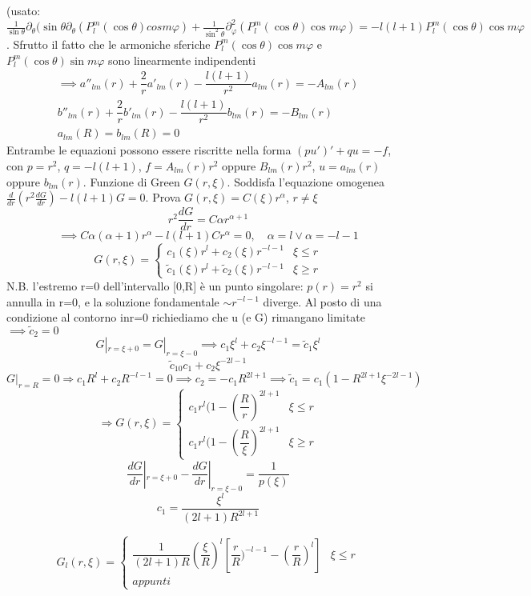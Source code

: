 \documentclass[a4paper,11pt]{report}
\begin{document}
(usato: $\frac{1}{\sin\theta}\partial_\theta(\sin \theta\partial_\theta(P_l^m(\cos\theta)cos m \varphi)+\frac{1}{\sin^2\theta} \partial^2_\varphi(P_l^m(\cos\theta)\cos m\varphi)=-l(l+1)P_l^m(\cos\theta)\cos m\varphi$. Sfrutto il fatto che le armoniche sferiche $P_l^m(\cos\theta)\cos m\varphi$ e $P_l^m(\cos\theta)\sin m\varphi$ sono linearmente indipendenti
\begin{equation}
\begin{matrix}
\implies a''_{lm}(r) +\dfrac{2}{r}a'_{lm}(r) - \dfrac{l(l+1)}{r^2}a_{lm}(r)=-A_{lm}(r)\\
 b''_{lm}(r) +\dfrac{2}{r}b'_{lm}(r) - \dfrac{l(l+1)}{r^2}b_{lm}(r)=-B_{lm}(r)\\
a_{lm}(R)=b_{lm}(R)=0
\end{matrix}
\end{equation}
Entrambe le equazioni possono essere riscritte nella forma $(pu')' + qu=-f$, con $p=r^2$, $q=-l(l+1)$, $f=A_{lm}(r)r^2$ oppure $B_{lm}(r)r^2$, $u=a_{lm}(r)$ oppure $b_{lm}(r)$. 
Funzione di Green $G(r,\xi)$. Soddisfa l'equazione omogenea $\frac{d}{dr}\left(r^2\frac{dG}{dr}\right)-l(l+1)G=0$. Prova $G(r,\xi)=C(\xi)r^\alpha$, $r\neq \xi$
$$
r^2\dfrac{dG}{dr}=C\alpha r^{\alpha+1}
$$
$$
\implies C\alpha(\alpha+1)r^\alpha - l(l+1)Cr^\alpha=0, \quad \alpha=l \vee \alpha=-l-1
$$
$$
G(r,\xi)=\left\{
\begin{matrix}
c_1(\xi)r^l + c_2(\xi)r^{-l-1} & \xi\leq r\\
\tilde{c}_1(\xi)r^l + \tilde{c}_2(\xi)r^{-l-1} & \xi \geq r
\end{matrix}\right.
$$
N.B. l'estremo r=0 dell'intervallo [0,R] è un punto singolare: $p(r)=r^2$ si annulla in r=0, e la soluzione fondamentale $\sim r^{-l-1}$ diverge.
Al posto di una condizione al contorno inr=0 richiediamo che u (e G) rimangano limitate $\implies \tilde{c}_2=0$
$$
G|_{r=\xi+0}=G|_{r=\xi-0} \implies c_1\xi^l + c_2\xi^{-l-1}=\tilde{c}_1\xi^l
$$
$$
\tilde{c}_10c_1 + c_2 \xi^{-2l-1}
$$
$$
G|_{r=R}=0 \Rightarrow c_1R^l+c_2R^{-l-1}=0 \implies c_2=-c_1R^{2l + 1} \implies \tilde{c}_1=c_1(1-R^{2l+1}\xi^{-2l-1})
$$
$$
\Rightarrow G(r,\xi)=\left\{\begin{matrix}
c_1r^l(1-(\dfrac{R}{r})^{2l+1} & \xi\leq r \\
c_1r^l(1-(\dfrac{R}{\xi})^{2l+1} & \xi\geq r 
\end{matrix}\right.
$$
$$
\dfrac{dG}{dr}|_{r=\xi+0}-\dfrac{dG}{dr}|_{r=\xi-0}=\dfrac{1}{p(\xi)}
$$
$$
c_1=\dfrac{\xi^l}{(2l+1)R^{2l+1}}
$$

\begin{equation}
G_l(r,\xi)=\left\{
\begin{matrix}
\dfrac{1}{(2l+1)R}(\dfrac{\xi}{R})^l[\dfrac{r}{R})^{-l-1} - (\dfrac{r}{R})^l] & \xi\leq r\\
appunti
\end{matrix}\right.
\end{equation}
\end{document}

